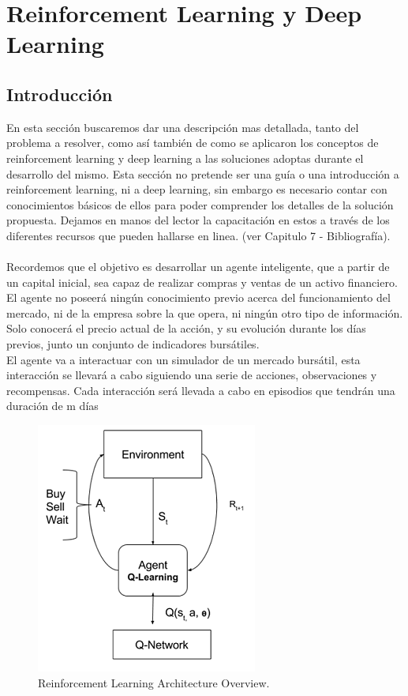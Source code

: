 \chapter{Reinforcement Learning y Deep Learning}


\section{Introducción}

En esta sección buscaremos dar una descripción mas detallada, tanto del problema a resolver, como así también de como se aplicaron los conceptos de reinforcement learning y deep learning a las soluciones adoptas durante el desarrollo del mismo. Esta sección no pretende ser una guía o una introducción a reinforcement learning, ni a deep learning, sin embargo es necesario contar con conocimientos básicos de ellos para poder comprender los detalles de la solución propuesta. Dejamos en manos del lector la capacitación en estos a través de los diferentes recursos que pueden hallarse en linea. (ver Capitulo 7 - Bibliografía).
\\\\
Recordemos que el objetivo es desarrollar un agente inteligente, que a partir de un capital inicial, sea capaz de realizar compras y ventas de un activo financiero. El agente no poseerá ningún conocimiento previo acerca del funcionamiento del mercado, ni de la empresa sobre la que opera, ni ningún otro tipo de información. Solo conocerá el precio actual de la acción, y su evolución durante los días previos, junto un conjunto de indicadores bursátiles. 
\\
El agente va a interactuar con un simulador de un mercado bursátil, esta interacción se llevará a cabo siguiendo una serie de acciones, observaciones y recompensas.
Cada interacción será llevada a cabo en episodios que tendrán una duración de m días
\\

\begin{figure}[h!]
	\includegraphics[scale=0.5]{imagenes/deepRLOverview.png}
	\caption{Reinforcement Learning Architecture Overview.}
\end{figure}


